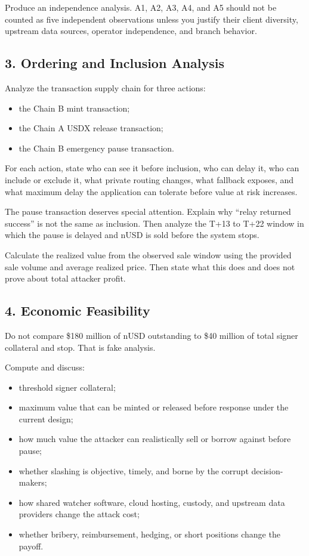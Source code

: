 Produce an independence analysis. A1, A2, A3, A4, and A5 should not be counted as five independent observations unless you justify their client diversity, upstream data sources, operator independence, and branch behavior.

\subsection*{3. Ordering and Inclusion Analysis}

Analyze the transaction supply chain for three actions:

\begin{itemize}
\item the Chain B mint transaction;
\item the Chain A USDX release transaction;
\item the Chain B emergency pause transaction.
\end{itemize}

For each action, state who can see it before inclusion, who can delay it, who can include or exclude it, what private routing changes, what fallback exposes, and what maximum delay the application can tolerate before value at risk increases.

The pause transaction deserves special attention. Explain why ``relay returned success'' is not the same as inclusion. Then analyze the T+13 to T+22 window in which the pause is delayed and nUSD is sold before the system stops.

Calculate the realized value from the observed sale window using the provided sale volume and average realized price. Then state what this does and does not prove about total attacker profit.

\subsection*{4. Economic Feasibility}

Do not compare \$180 million of nUSD outstanding to \$40 million of total signer collateral and stop. That is fake analysis.

Compute and discuss:

\begin{itemize}
\item threshold signer collateral;
\item maximum value that can be minted or released before response under the current design;
\item how much value the attacker can realistically sell or borrow against before pause;
\item whether slashing is objective, timely, and borne by the corrupt decision-makers;
\item how shared watcher software, cloud hosting, custody, and upstream data providers change the attack cost;
\item whether bribery, reimbursement, hedging, or short positions change the payoff.
\end{itemize}

